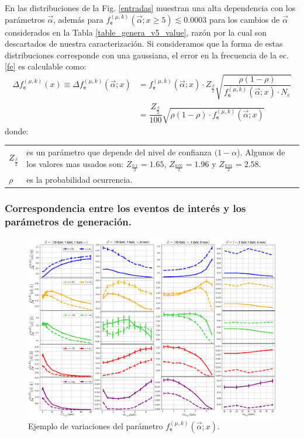 En las distribuciones de la Fig. \ref{entradas} muestran una alta dependencia con los parámetros $\vec{\alpha}$, además para $f^{(\mu, k)}_\textsf{e} (\vec{\alpha}; x\geqslant 5)\lesssim 0.0003$ para los cambios de $\vec{\alpha}$ considerados en la Tabla  \ref{table_genera_v5_value}, razón por la cual son descartados de nuestra caracterización. Si consideramos que la forma de estas distribuciones corresponde con una gaussiana, el error en la frecuencia de la ec. \ref{fe} es calculable como:
\begin{eqnarray}\label{error0}
\Delta f^{(\mu, k)}_\textsf{e} (x) \equiv \Delta f^{(\mu, k)}_\textsf{e} (\vec{\alpha}; x) 
& = f^{(\mu, k)}_\textsf{e} (\vec{\alpha}; x) \cdot Z_{\frac{\beta}{2}} \sqrt{\dfrac{\rho(1-\rho)}{f^{(\mu, k)}_\textsf{e} (\vec{\alpha}; x)\cdot N_e}} \\
& = \dfrac{Z_{\frac{\beta}{2}}}{100} \sqrt{\rho(1-\rho)\cdot f^{(\mu, k)}_\textsf{e} (\vec{\alpha}; x)} ~~~~~~~~~~~
\end{eqnarray}%
donde:\\
\begin{tabular}{lp{14cm}}
$Z_{\frac{\beta}{2}}$ & es un parámetro que depende del nivel de confianza $(1-\alpha$). Algunos de los valores mas usados son: $Z_{\frac{0.1}{2}}=1.65$, $Z_{\frac{0.05}{2}}=1.96$ y $Z_{\frac{0.01}{2}}=2.58$.\\
$\rho$ & es la probabilidad ocurrencia.
\end{tabular}

\subsubsection{Correspondencia entre los eventos de interés y los parámetros de generación.}
\begin{figure}[!t]
\centering
\includegraphics[width=.9\textwidth]{Simulacion/imagenes/Comparacion_Distribucion_Entries0.png}
\caption{Ejemplo de variaciones del parámetro $f^{(\mu, k)}_\textsf{e} (\vec{\alpha}; x)$.}
\label{entradasALL}
\end{figure}

